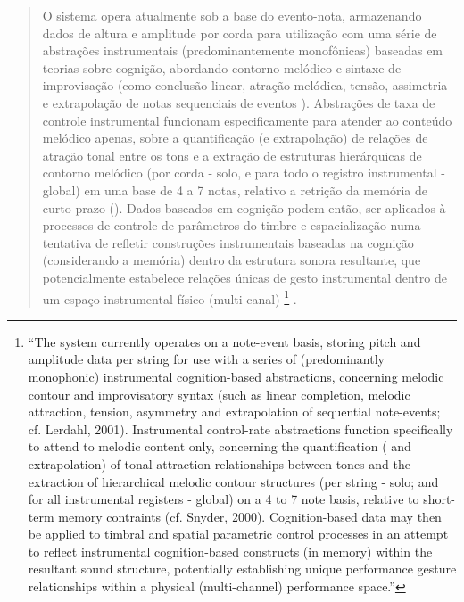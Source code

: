 \documentclass{ppgmus}
\begin{document}
\begin{quotation}
O sistema opera atualmente sob a base do evento-nota, armazenando  dados de altura e amplitude por corda para
utilização com uma série de abstrações instrumentais (predominantemente monofônicas) baseadas em teorias sobre cognição, 
abordando contorno melódico e sintaxe de improvisação (como conclusão linear, atração melódica, tensão,
assimetria e extrapolação de notas sequenciais de eventos \cite{lerdahl2001}). 
Abstrações de taxa de controle instrumental funcionam especificamente para atender ao conteúdo melódico apenas, 
sobre a quantificação (e extrapolação) de relações  de atração tonal  entre os tons e a extração de 
estruturas hierárquicas de contorno melódico (por corda - solo, e para todo o registro instrumental - global) em uma
base de 4 a 7 notas, relativo a retrição da memória de curto prazo (\cite{snyder}). Dados baseados em cognição podem
então, ser aplicados à processos de controle de parâmetros do timbre e espacialização  numa tentativa de refletir 
construções instrumentais baseadas na cognição (considerando a memória) dentro da estrutura sonora resultante, 
que potencialmente estabelece relações únicas de gesto instrumental dentro de um espaço instrumental físico (multi-canal)
\footnote{
``The system currently operates on a note-event basis, storing pitch and amplitude data per string for
use with a series of (predominantly monophonic) instrumental cognition-based abstractions, concerning
melodic contour and improvisatory syntax (such as linear completion, melodic attraction, tension,
asymmetry and extrapolation of sequential note-events; cf. Lerdahl, 2001). Instrumental control-rate
abstractions function specifically to attend to melodic content only, concerning the quantification (
and extrapolation) of tonal attraction relationships between tones and the extraction of hierarchical
melodic contour structures (per string - solo; and for all instrumental registers - global) on a 4 to
7 note basis, relative to short-term memory contraints (cf. Snyder, 2000). Cognition-based data may
then be applied to timbral and spatial parametric control processes in an attempt to reflect instrumental
cognition-based constructs (in memory) within the resultant sound structure, potentially establishing
unique performance gesture relationships within a physical (multi-channel) performance space.''} \cite{rickgrahan}. 
\end{quotation}
\end{document}
